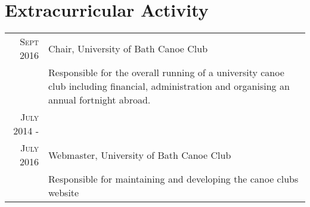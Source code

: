 \documentclass[a4paper,12pt]{article}
\begin{document}
\section{Extracurricular Activity}
\begin{tabular}{rp{11cm}}
 \textsc{Sept} 2016 & Chair, University of Bath Canoe Club\\& \footnotesize{Responsible for the overall running of a university canoe club including financial, administration and organising an annual fortnight  abroad.} \\
 \textsc{July} 2014 -\\ \textsc{July} 2016 & Webmaster, University of Bath Canoe Club\\ &\footnotesize{Responsible for maintaining and developing the canoe clubs website}
\end{tabular}



\end{document}
